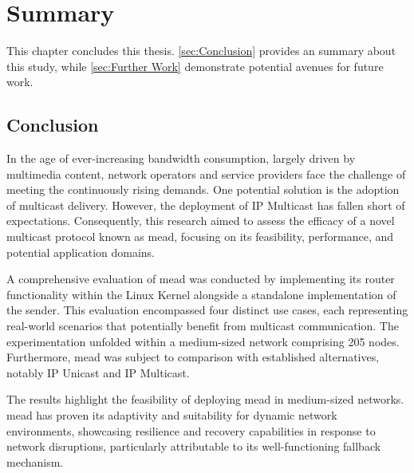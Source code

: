 

\chapter{Summary} %
\label{chap:Summary}
This chapter concludes this thesis.
\autoref{sec:Conclusion} provides an summary about this study, while
    \autoref{sec:Further Work} demonstrate potential avenues for future work.

\section{Conclusion} %
\label{sec:Conclusion}
In the age of ever-increasing bandwidth consumption, largely driven by
    multimedia content, network operators and service providers face the
    challenge of meeting the continuously rising demands.
One potential solution is the adoption of multicast delivery.
However, the deployment of IP Multicast has fallen short of expectations.
Consequently, this research aimed to assess the efficacy of a novel multicast
    protocol known as \gls{mead}, focusing on its feasibility, performance, and
    potential application domains.

A comprehensive evaluation of \gls{mead} was conducted by implementing its
    router functionality within the Linux Kernel alongside a standalone
    implementation of the sender.
This evaluation encompassed four distinct use cases, each representing
    real-world scenarios that potentially benefit from multicast communication.
The experimentation unfolded within a medium-sized network comprising 205
    nodes.
Furthermore, \gls{mead} was subject to comparison with established
    alternatives, notably IP Unicast and IP Multicast.

The results highlight the feasibility of deploying \gls{mead} in medium-sized
    networks.
\gls{mead} has proven its adaptivity and suitability for dynamic network
    environments, showcasing resilience and recovery capabilities in response
    to network disruptions, particularly attributable to its well-functioning
    fallback mechanism.

